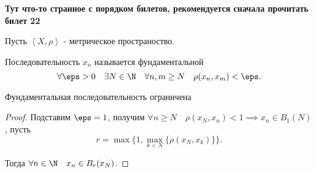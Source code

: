 
\textbf{Тут что-то странное с порядком билетов, рекомендуется сначала прочитать билет 22}

\begin{definition} \thmslashn 

    Пусть $\left<X, \rho\right>$ - метрическое пространоство.

    Последовательность $x_{n}$ называется фундаментальной
    \[ \forall{\eps > 0}\quad \exists{N\in \N}\quad \forall{n, m \ge  N}\quad \rho(x_{n}, x_{m}) < \eps  .\] 
\end{definition}

\begin{lemma} \thmslashn

    Фундаментальная последовательность ограничена

    \begin{proof} \thmslashn
    
        Подставим $\eps = 1$, получим $\forall{n \ge N}\quad \rho(x_{N}, x_{n}) < 1 \implies x_{n}\in B_{1}(N)$, пусть 
        \[ r = \max \{1, \max\limits_{k < N} \{\rho(x_{N}, x_{k})\} \} .\]

        Тогда $\forall{n\in \N}\quad x_{n}\in B_{r}(x_{N})$.
    \end{proof}
\end{lemma}


